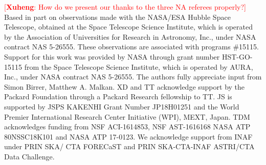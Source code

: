 \documentclass[twocolumn,trackchanges]{aastex63}
\newcommand{\hst}{{\it HST}}
\newcommand{\ding}[1]{\textcolor{red}{[{\bf Xuheng}: #1]}}
\begin{document}
\acknowledgments
\ding{How do we present our thanks to the three NA referees properly?}
Based in part on observations made with the NASA/ESA Hubble Space Telescope, obtained at the Space Telescope Science Institute, which is operated by the Association of Universities for Research in Astronomy, Inc., under NASA contract NAS 5-26555. These observations are associated with programs \#15115. Support for this work was provided by NASA through grant number HST-GO-15115 from the Space Telescope Science Institute, which is operated by AURA, Inc., under NASA contract NAS 5-26555. The authors fully appreciate input from Simon Birrer, Matthew A. Malkan. XD and TT acknowledge support by the Packard Foundation through a Packard Research fellowship to TT. JS is supported by JSPS KAKENHI Grant Number JP18H01251 and the World Premier International Research Center Initiative (WPI), MEXT, Japan. TDM acknowledges funding from NSF ACI-1614853,  NSF AST-1616168 NASA ATP 80NSSC18K101 and NASA ATP 17-0123. We acknowledge support from INAF under PRIN SKA/ CTA FORECaST and PRIN SKA-CTA-INAF ASTRI/CTA Data Challenge. 


%


\end{document}
